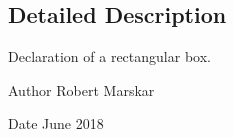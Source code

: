 \subsection{Detailed Description}
Declaration of a rectangular box. 

\begin{DoxyAuthor}{Author}
Robert Marskar 
\end{DoxyAuthor}
\begin{DoxyDate}{Date}
June 2018 
\end{DoxyDate}
